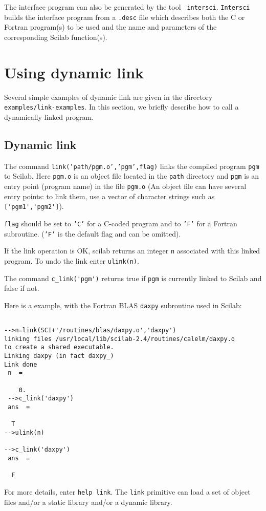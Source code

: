 The interface program can also be generated by the tool {\tt
intersci}. {\tt Intersci} builds the interface
program from a {\tt .desc} file which describes both the C or 
Fortran program(s) to be used and the name and parameters of
the corresponding Scilab function(s). 

\section{Using dynamic link}
Several simple examples of dynamic link are  given in the directory
{\tt examples/link-examples}. In this section, we briefly describe 
how to call a dynamically linked program. 
\subsection{Dynamic link}
\label{dynamiclink}
The command {\tt link('path/pgm.o','pgm',flag)}
links the compiled program {\tt pgm} to Scilab.
Here {\tt pgm.o} is an object file located in the {\tt path}
directory and {\tt pgm} is an entry point (program name) in the 
file {\tt pgm.o} (An object file can have several entry points: to link 
them, use a vector of character strings such as \verb!['pgm1','pgm2']!).

{\tt flag} should be set to {\tt 'C'} for a C-coded program
and to {\tt 'F'} for a Fortran subroutine. ({\tt 'F'} is
the default flag and can be omitted).

If the link operation is OK, scilab returns an integer {\tt n} associated
with this linked program. To undo the link enter {\tt ulink(n)}.

The command \verb!c_link('pgm')! returns true if {\tt pgm} is
currently linked to Scilab and false if not.

\noindent
Here is a example, with the Fortran BLAS {\tt daxpy} subroutine 
used in Scilab:
\begin{verbatim}

-->n=link(SCI+'/routines/blas/daxpy.o','daxpy')
linking files /usr/local/lib/scilab-2.4/routines/calelm/daxpy.o
to create a shared executable.
Linking daxpy (in fact daxpy_)
Link done
 n  =
 
    0.  
 -->c_link('daxpy')
 ans  =
 
  T  
-->ulink(n)
 
-->c_link('daxpy')
 ans  =
 
  F  
\end{verbatim}

For more details, enter {\tt help link}. The {\tt link} primitive can load
a set of object files and/or a static library and/or a dynamic library.

